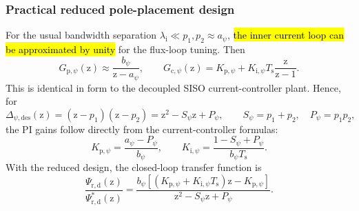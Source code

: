 \begin{frame}
    \frametitle{Practical reduced pole-placement design}
    For the usual bandwidth separation $\lambda_\mathrm{i}\ll p_1,p_2\approx a_\psi$, \hl{the inner current loop can be approximated by unity} for the flux-loop tuning. Then
    \begin{equation}
        G_{\mathrm{p},\psi}(\mathrm{z})\approx\frac{b_\psi}{\mathrm{z}-a_\psi},
        \qquad
        G_{\mathrm{c},\psi}(\mathrm{z})=K_{\mathrm{p},\psi}+K_{\mathrm{i},\psi}T_\mathrm{s}\frac{\mathrm{z}}{\mathrm{z}-1}.
        \label{eq:IM_flux_reduced_plant_controller}
    \end{equation}\pause%
    This is identical in form to the decoupled SISO current-controller plant. Hence, for
    \begin{equation}
        \Delta_{\psi,\mathrm{des}}(\mathrm{z})=(\mathrm{z}-p_1)(\mathrm{z}-p_2)
        =\mathrm{z}^2-S_\psi\mathrm{z}+P_\psi,
        \qquad
        S_\psi=p_1+p_2,
        \quad P_\psi=p_1p_2,
        \label{eq:IM_flux_reduced_poles}
    \end{equation}
    the PI gains follow directly from the current-controller formulas:
    \begin{equation}
        K_{\mathrm{p},\psi}=\frac{a_\psi-P_\psi}{b_\psi},
        \qquad
        K_{\mathrm{i},\psi}=\frac{1-S_\psi+P_\psi}{b_\psi T_\mathrm{s}} .
        \label{eq:IM_flux_reduced_PI_gains}
    \end{equation}\pause%
    With the reduced design, the closed-loop transfer function is
    \begin{equation}
        \frac{\Psi_{\mathrm{r,d}}(\mathrm{z})}{\Psi^{*}_{\mathrm{r,d}}(\mathrm{z})}
        =\frac{b_\psi\left[(K_{\mathrm{p},\psi}+K_{\mathrm{i},\psi}T_\mathrm{s})\mathrm{z}-K_{\mathrm{p},\psi}\right]}{\mathrm{z}^2-S_\psi\mathrm{z}+P_\psi} .
        \label{eq:closed_loop_TF_rotor_flux_IM}
    \end{equation}
\end{frame}

